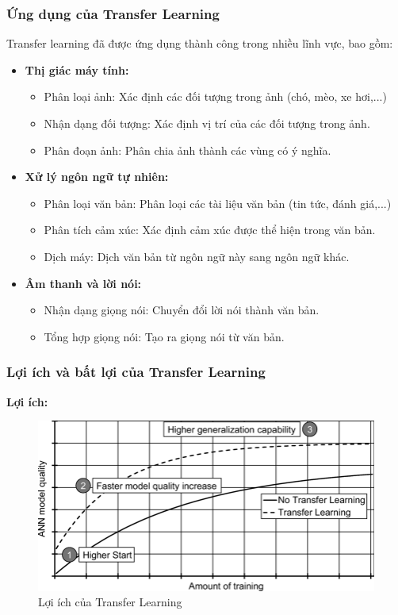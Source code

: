 \subsubsection{Ứng dụng của Transfer Learning}

Transfer learning đã được ứng dụng thành công trong nhiều lĩnh vực, bao gồm:

\begin{itemize}
    \item \textbf{Thị giác máy tính:} 
        \begin{itemize}
            \item Phân loại ảnh: Xác định các đối tượng trong ảnh (chó, mèo, xe hơi,...)
            \item Nhận dạng đối tượng: Xác định vị trí của các đối tượng trong ảnh.
            \item Phân đoạn ảnh: Phân chia ảnh thành các vùng có ý nghĩa.
        \end{itemize}
    \item \textbf{Xử lý ngôn ngữ tự nhiên:}
        \begin{itemize}
            \item Phân loại văn bản: Phân loại các tài liệu văn bản (tin tức, đánh giá,...)
            \item Phân tích cảm xúc: Xác định cảm xúc được thể hiện trong văn bản.
            \item Dịch máy: Dịch văn bản từ ngôn ngữ này sang ngôn ngữ khác.
        \end{itemize}
    \item \textbf{Âm thanh và lời nói:}
        \begin{itemize}
            \item Nhận dạng giọng nói: Chuyển đổi lời nói thành văn bản.
            \item Tổng hợp giọng nói: Tạo ra giọng nói từ văn bản.
        \end{itemize}
\end{itemize}

\subsubsection{Lợi ích và bất lợi của Transfer Learning}

\textbf{Lợi ích:}

 \begin{figure}[H]
    \centering
    \includegraphics[scale = 0.2]{Images/Theoretical basis/Possible-advantages-of-transfer-learning.png}
\caption{Lợi ích của Transfer Learning}
\end{figure}


